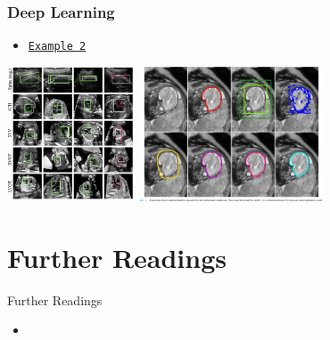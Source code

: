 \begin{frame}
    \frametitle{Deep Learning}
    \begin{itemize}
        \item \href{https://www.youtube.com/watch?v=4V8V0jF0zFc}{\texttt{Example 2}}
        \end{itemize}
        \begin{center}
    \includegraphics[height=4cm]{img/ultrasound.png}
    \includegraphics[height=4cm]{img/fetal.png}
     \end{center}
\end{frame}

\section{Further Readings}%
\label{sec:further_readings}


\begin{frame}[t]{Further Readings}
    \begin{itemize}
        \item {}
    \end{itemize}
\end{frame}



